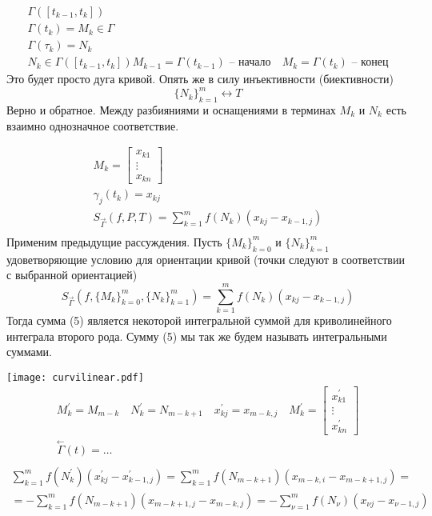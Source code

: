 \documentclass[main]{subfiles}
\begin{document}
\begin{definition}
    \begin{gather*}
        \Gamma([t_{k-1}, t_k]) \\
        \Gamma(t_k) = M_k \in \Gamma \\
        \Gamma(\tau_k) = N_k \\
        N_k \in \Gamma([t_{k-1},t_k])
        M_{k-1} = \Gamma(t_{k-1}) \text{ -- начало} \quad M_k = \Gamma(t_k) \text{ -- конец}
    \end{gather*}
    Это будет просто дуга кривой. Опять же в силу инъективности (биективности)
    \[ \{ N_k \}_{k=1}^m \leftrightarrow T \] Верно и обратное.
    Между разбияниями и оснащениями в терминах $M_k$ и $N_k$ есть взаимно однозначное соответствие.
\end{definition}

\begin{gather*}
    M_k = \begin{bmatrix*}
        x_{k1} \\
        \vdots \\
        x_{kn}
    \end{bmatrix*} \\
    \gamma_j(t_k) = x_{kj} \\
    S_{\stackrel{\rightarrow}{\Gamma}}(f,P,T) = \sum^m_{k=1} f(N_k)(x_{kj} - x_{k-1,j}) \tag{4} \\
\end{gather*}
Применим предыдущие рассуждения. Пусть $ \{ M_k \}^m_{k=0}$ и $\{ N_k \}^m_{k=1}$ удоветворяющие условию для ориентации кривой
(точки следуют в соответствии с выбранной ориентацией)
\[  S_{\stackrel{\rightarrow}{\Gamma}} (f,\{ M_k \}^m_{k=0},\{ N_k \}^m_{k=1} ) =  \sum^m_{k=1} f(N_k)(x_{kj} - x_{k-1,j}) \tag{5} \]
Тогда сумма (5) является некоторой интегральной суммой для криволинейного интеграла второго рода.
Сумму (5) мы так же будем называть интегральными суммами.


\texttt{[image: curvilinear.pdf]}
\begin{gather*}
    M^\prime_k = M_{m-k} \quad N^\prime_k = N_{m-k+1} \quad x^\prime_{kj} = x_{m-k,j}  \quad M^\prime_k= \begin{bmatrix*}
        x^\prime_{k1} \\
        \vdots \\
        x^\prime_{kn}
    \end{bmatrix*}\\
    \stackrel{\leftarrow}{\Gamma}(t) = \ldots \\
\end{gather*}
\begin{multline*}
    \sum^m_{k=1} f(N^\prime_k)(x^\prime_{kj} - x^\prime_{k-1,j}) = \sum^m_{k=1}f(N_{m-k+1})(x_{m-k,i} - x_{m-k+1,j}) =\\
    = - \sum^m_{k=1} f(N_{m-k+1})(x_{m-k+1,j} - x_{m-k,j}) = -\sum^m_{\nu = 1}f(N_\nu) (x_{\nu j} - x_{\nu -1,j}) \tag{6}
\end{multline*}
\end{document}
